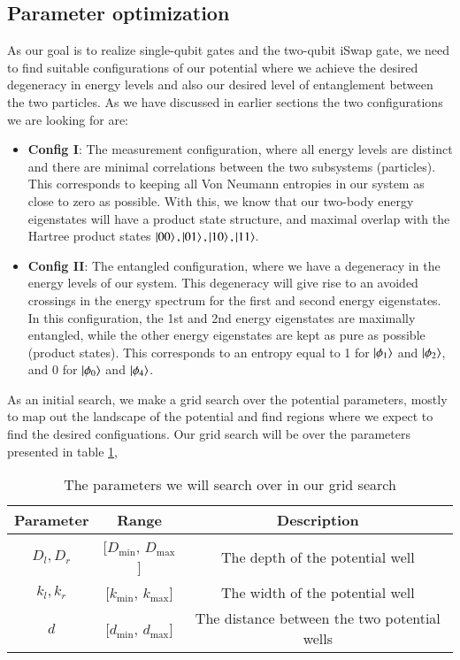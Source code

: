 \documentclass{subfiles}
\begin{document}
\subsection{Parameter optimization}\label{sec:optimization_procedure}
As our goal is to realize single-qubit gates and the two-qubit iSwap gate, we need to find suitable configurations of our potential where we achieve the desired degeneracy in energy levels and also our desired level of entanglement between the two particles. As we have discussed in earlier sections the two configurations we are looking for are:
\begin{itemize}
    \item \textbf{Config I}: The measurement configuration, where all energy levels are distinct and there are minimal correlations between the two subsystems (particles). This corresponds to keeping all Von Neumann entropies in our system as close to zero as possible. With this, we know that our two-body energy eigenstates will have a product state structure, and maximal overlap with the Hartree product states $\ket{00}, \ket{01}, \ket{10}, \ket{11}$.
    \item \textbf{Config II}: The entangled configuration, where we have a degeneracy in the energy levels of our system. This degeneracy will give rise to an avoided crossings in the energy spectrum for the first and second energy eigenstates. In this configuration, the 1st and 2nd energy eigenstates are maximally entangled, while the other energy eigenstates are kept as pure as possible (product states). This corresponds to an entropy equal to 1 for $\ket{\phi_1}$ and $\ket{\phi_2}$, and 0 for $\ket{\phi_0}$ and $\ket{\phi_4}$. 
\end{itemize}
As an initial search, we make a grid search over the potential parameters, mostly to map out the landscape of the potential and find regions where we expect to find the desired configuations. Our grid search will be over the parameters presented in table \ref{tab:parameter_search}, 
\begin{table}[h!]
    \centering
    \begin{tabular}{|c|c|c|}
        \hline
        Parameter & Range & Description \\
        \hline
        $D_l, D_r$ & [$D_{\text{min}}$, $D_{\text{max}}$] & The depth of the potential well \\
        $k_l, k_r$ & [$k_{\text{min}}$, $k_{\text{max}}$] & The width of the potential well \\
        $d$ & [$d_{\text{min}}$, $d_{\text{max}}$] & The distance between the two potential wells \\
        \hline
    \end{tabular}
    \caption{The parameters we will search over in our grid search}
    \label{tab:parameter_search}
\end{table}
\end{document}

